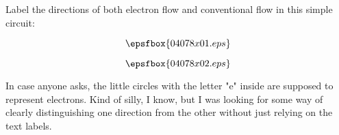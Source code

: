 

Label the directions of both electron flow and conventional flow in this simple circuit:

$$\epsfbox{04078x01.eps}$$







$$\epsfbox{04078x02.eps}$$







In case anyone asks, the little circles with the letter "e" inside are supposed to represent electrons.  Kind of silly, I know, but I was looking for some way of clearly distinguishing one direction from the other without just relying on the text labels.




